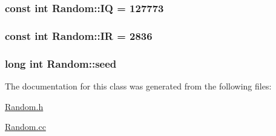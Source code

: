 \hypertarget{classRandom_7792314b78dc687dfd6a7b511d937c75}{
\subsubsection{\setlength{\rightskip}{0pt plus 5cm}const int {\bf Random::IQ} = 127773}}
\label{classRandom_7792314b78dc687dfd6a7b511d937c75}


\hypertarget{classRandom_8c7d5f7cf040525a9111fa69b1d35a38}{
\subsubsection{\setlength{\rightskip}{0pt plus 5cm}const int {\bf Random::IR} = 2836}}
\label{classRandom_8c7d5f7cf040525a9111fa69b1d35a38}


\hypertarget{classRandom_b5bc0589111c5d5198e82cffde01964b}{
\subsubsection{\setlength{\rightskip}{0pt plus 5cm}long int {\bf Random::seed}}}
\label{classRandom_b5bc0589111c5d5198e82cffde01964b}




The documentation for this class was generated from the following files:\begin{CompactItemize}
\item 
\hyperlink{Random_8h}{Random.h}\item 
\hyperlink{Random_8cc}{Random.cc}\end{CompactItemize}
